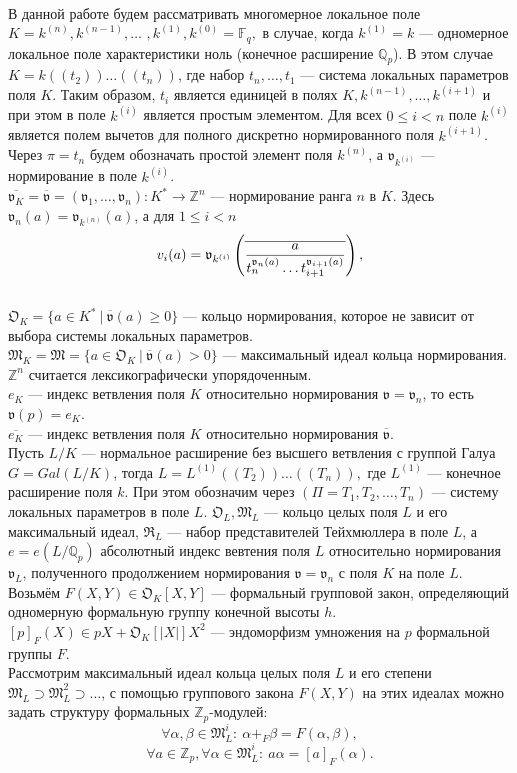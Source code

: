 \documentclass[a4paper]{article}
\newcommand{\Qp}{\mathbb{Q}_p}
\newcommand{\Zp}{\mathbb{Z}_p}
\newcommand{\Fq}{\mathbb{F}_q}
\newcommand{\Z}{\mathbb{Z}}
\newcommand{\ML}{\mathfrak{M}_L}
\newcommand{\MK}{\mathfrak{M}_K}
\newcommand{\OK}{\mathfrak{O}_K}
\newcommand{\OL}{\mathfrak{O}_L}
\newcommand{\RL}{\mathfrak{R}_L}
\newcommand{\val}{\mathfrak{v}}
\newcommand{\olval}{\overline{\mathfrak{v}}}
\newcommand{\Leq}{\leqslant}
\newcommand{\Geq}{\geqslant}
\begin{document}
\paragraph{}
В данной работе будем рассматривать многомерное локальное поле $K=k^{(n)}, k^{(n-1)},\dots$ $,k^{(1)},k^{(0)}=\Fq,$ в случае, когда $k^{(1)} = k$ --- одномерное локальное поле характеристики ноль (конечное расширение $\Qp$). В этом случае $K = k((t_2))\dots((t_n))$, где набор $t_n,\dots,t_1$ --- система локальных параметров поля $K$. Таким образом, $t_i$ является единицей в полях $K,k^{(n-1)},\dots,k^{(i+1)}$ и при этом в поле $k^{(i)}$ является простым элементом. Для всех $0 \leq i < n$ поле $k^{(i)}$ является полем вычетов для полного дискретно нормированного поля $k^{(i+1)}$. Через $\pi = t_n$ будем обозначать простой элемент поля $k^{(n)}$, а $\val_{k^{(i)}}$ --- нормирование в поле $k^{(i)}$.\\
$\overline{\val_K}=\olval=(\val_1,\dots,\val_n):K^*\rightarrow\Z^n$ --- нормирование ранга $n$ в $K$. Здесь $\val_n(a)=\val_{k^{(n)}}(a)$, а для $1\Leq i<n$
$$v_i(a) = \val_{k^{(i)}} \left( \overline {a \over { t_n^{\val_n(a)} \ldots t_{i+1}^{\val_{i+1}(a)} } } \right),$$\\
$\OK=\{a\in K^*\ |\ \overline{\val}(a)\Geq0\}$ --- кольцо нормирования, которое не зависит от выбора системы локальных параметров.\\
$\MK=\mathfrak{M}=\{a\in\OK\ |\ \overline{\val}(a)>0\}$ --- максимальный идеал кольца нормирования. $\Z^n$ считается лексикографически упорядоченным.\\
$e_K$ --- индекс ветвления поля $K$ относительно нормирования $\val=\val_n$, то есть $\val(p)=e_K$.\\
$\overline{e_K}$ --- индекс ветвления поля $K$ относительно нормирования $\olval$.\\

Пусть $L/K$ --- нормальное расширение без высшего ветвления с группой Галуа $G=Gal(L/K)$, тогда $L = L^{(1)}((T_2))\dots((T_n)),$ где $L^{(1)}$ --- конечное расширение поля $k$. При этом обозначим через $(\Pi = T_1, T_2, \dots, T_n)$ --- систему локальных параметров в поле $L$.
$\OL,\ML$ --- кольцо целых поля $L$ и его максимальный идеал, $\RL$ --- набор представителей Тейхмюллера в поле $L$, а $e=e(L/\Qp)$ абсолютный индекс вевтения поля $L$ относительно нормирования $\val_L$, полученного продолжением нормирования $\val=\val_n$ с поля $K$ на поле $L$.\\


Возьмём $F(X,Y)\in\OK[X,Y]$ --- формальный групповой закон, определяющий одномерную формальную группу конечной высоты $h$.\\ 
$[p]_F(X) \in pX+\OK[|X|]X^2$ --- эндоморфизм умножения на $p$ формальной группы $F$.\\
Рассмотрим максимальный идеал кольца целых поля $L$ и его степени $\ML\supset\ML^2\supset\dots$, с помощью группового закона $F(X,Y)$ на этих идеалах можно задать структуру формальных $\Zp$-модулей:
$$\forall\alpha,\beta\in\ML^i:\ \alpha+_F\beta=F(\alpha,\beta),$$
$$\forall a\in\Zp,\forall\alpha\in\ML^i:\ a\alpha=[a]_F(\alpha).$$
\end{document}
